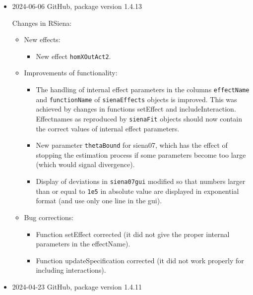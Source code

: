 \documentclass[a4paper,fleqn,11pt]{article}
\newcommand{\+}{\, + \,}
\newcommand{\sfn}[1]{\textsf{#1}}
\begin{document}
\begin{small}
\begin{itemize}
\item 2024-06-06 GitHub, package version 1.4.13


Changes in RSiena:
\begin{itemize}
\item New effects:
   \begin{itemize}
  \item New effect \texttt{homXOutAct2}.
    \end{itemize}
\item Improvements of functionality:
   \begin{itemize}
  \item The handling of internal effect parameters in the columns
    \texttt{effectName}
    and \texttt{functionName} of \texttt{sienaEffects} objects is improved.
    This was achieved by changes in functions \sfn{setEffect}
    and \sfn{includeInteraction}.
    Effectnames as reproduced by \texttt{sienaFit} objects should now
    contain the correct values of internal effect parameters.
  \item New parameter \texttt{thetaBound} for \sfn{siena07}, which has the
    effect of stopping the estimation process if some parameters become
    too large (which would signal divergence).
  \item Display of deviations in \texttt{siena07gui} modified so that numbers
    larger than or equal to \texttt{1e5} in absolute value are displayed in
    exponential format (and use only one line in the gui).
    \end{itemize}
\item Bug corrections:
   \begin{itemize}
  \item Function \sfn{setEffect} corrected (it did not give the proper internal
    parameters in the \sfn{effectName}).
  \item Function \sfn{updateSpecification} corrected (it did not work properly
    for including interactions).
    \end{itemize}
\end{itemize}


\item 2024-04-23 GitHub, package version 1.4.11


\end{itemize}
\end{small}
\end{document}
